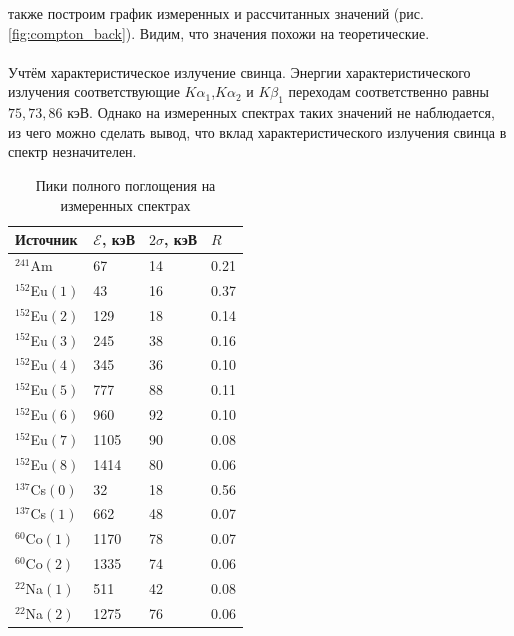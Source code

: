 \documentclass[a4paper,12pt]{article} %
\begin{document}
\noindent также построим график измеренных и рассчитанных значений (рис. \ref{fig:compton_back}). Видим, что значения похожи на теоретические.

\paragraph{} Учтём характеристическое излучение свинца. Энергии характеристического излучения соответствующие $K \alpha_1$,$K \alpha_2$ и $K \beta_1$ переходам соответственно равны $75, 73, 86$ кэВ. Однако на измеренных спектрах таких значений не наблюдается, из чего можно сделать вывод, что вклад характеристического излучения свинца в спектр незначителен.

\begin{table}[]
\centering
\begin{tabular}{|l|l|l|l|}
\hline
Источник        & $\mathcal{E}$, кэВ & $2 \sigma$, кэВ & $R$  \\ \hline
$^{241}$Am      & 67                 & 14              & 0.21 \\ \hline
$^{152}$Eu$(1)$ & 43                 & 16              & 0.37 \\ \hline
$^{152}$Eu$(2)$ & 129                & 18              & 0.14 \\ \hline
$^{152}$Eu$(3)$ & 245                & 38              & 0.16 \\ \hline
$^{152}$Eu$(4)$ & 345                & 36              & 0.10 \\ \hline
$^{152}$Eu$(5)$ & 777                & 88              & 0.11 \\ \hline
$^{152}$Eu$(6)$ & 960                & 92              & 0.10 \\ \hline
$^{152}$Eu$(7)$ & 1105               & 90              & 0.08 \\ \hline
$^{152}$Eu$(8)$ & 1414               & 80              & 0.06 \\ \hline
$^{137}$Cs$(0)$ & 32                 & 18              & 0.56 \\ \hline
$^{137}$Cs$(1)$ & 662                & 48              & 0.07 \\ \hline
$^{60}$Co$(1)$  & 1170               & 78              & 0.07 \\ \hline
$^{60}$Co$(2)$  & 1335               & 74              & 0.06 \\ \hline
$^{22}$Na$(1)$  & 511                & 42              & 0.08 \\ \hline
$^{22}$Na$(2)$  & 1275               & 76              & 0.06 \\ \hline
\end{tabular}
\caption{Пики полного поглощения на измеренных спектрах}
\label{tab:peaks}
\end{table}
\end{document}
